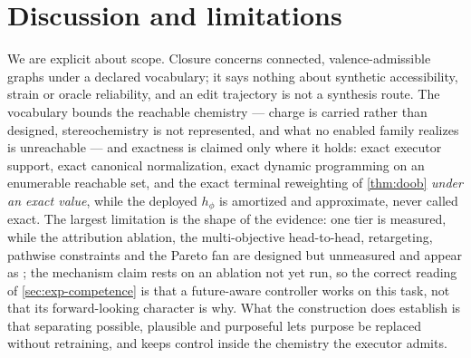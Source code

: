 
\section{Discussion and limitations}
\label{sec:discussion}

We are explicit about scope.
Closure concerns connected, valence-admissible graphs under a declared vocabulary; it says nothing about synthetic accessibility, strain or oracle reliability, and an edit trajectory is not a synthesis route.
The vocabulary bounds the reachable chemistry --- charge is carried rather than designed, stereochemistry is not represented, and what no enabled family realizes is unreachable --- and exactness is claimed only where it holds: exact executor support, exact canonical normalization, exact dynamic programming on an enumerable reachable set, and the exact terminal reweighting of \cref{thm:doob} \emph{under an exact value}, while the deployed $h_\phi$ is amortized and approximate, never called exact.
The largest limitation is the shape of the evidence: one tier is measured, while the attribution ablation, the multi-objective head-to-head, retargeting, pathwise constraints and the Pareto fan are designed but unmeasured and appear as \XXX{}; the mechanism claim rests on an ablation not yet run, so the correct reading of \cref{sec:exp-competence} is that a future-aware controller works on this task, not that its forward-looking character is why.
What the construction does establish is that separating possible, plausible and purposeful lets purpose be replaced without retraining, and keeps control inside the chemistry the executor admits.
